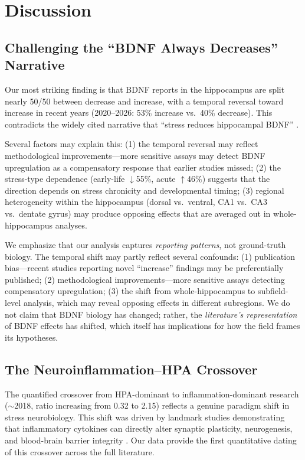 \documentclass[12pt,a4paper]{article}
\begin{document}
\section{Discussion}

\subsection{Challenging the ``BDNF Always Decreases'' Narrative}

Our most striking finding is that BDNF reports in the hippocampus are split nearly 50/50 between decrease and increase, with a temporal reversal toward increase in recent years (2020--2026: 53\% increase vs.\ 40\% decrease). This contradicts the widely cited narrative that ``stress reduces hippocampal BDNF'' \citep{duman2006,smith2005}.

Several factors may explain this: (1) the temporal reversal may reflect methodological improvements---more sensitive assays may detect BDNF upregulation as a compensatory response that earlier studies missed; (2) the stress-type dependence (early-life $\downarrow$55\%, acute $\uparrow$46\%) suggests that the direction depends on stress chronicity and developmental timing; (3) regional heterogeneity within the hippocampus (dorsal vs.\ ventral, CA1 vs.\ CA3 vs.\ dentate gyrus) may produce opposing effects that are averaged out in whole-hippocampus analyses.

We emphasize that our analysis captures \textit{reporting patterns}, not ground-truth biology. The temporal shift may partly reflect several confounds: (1) publication bias---recent studies reporting novel ``increase'' findings may be preferentially published; (2) methodological improvements---more sensitive assays detecting compensatory upregulation; (3) the shift from whole-hippocampus to subfield-level analysis, which may reveal opposing effects in different subregions. We do not claim that BDNF biology has changed; rather, the \textit{literature's representation} of BDNF effects has shifted, which itself has implications for how the field frames its hypotheses.

\subsection{The Neuroinflammation--HPA Crossover}

The quantified crossover from HPA-dominant to inflammation-dominant research ($\sim$2018, ratio increasing from 0.32 to 2.15) reflects a genuine paradigm shift in stress neurobiology. This shift was driven by landmark studies demonstrating that inflammatory cytokines can directly alter synaptic plasticity, neurogenesis, and blood-brain barrier integrity \citep{miller2016,wohleb2016}. Our data provide the first quantitative dating of this crossover across the full literature.
\end{document}
